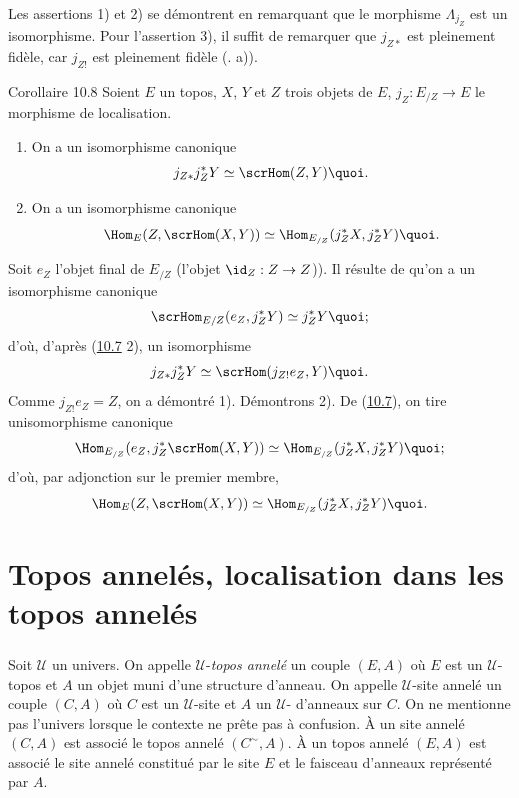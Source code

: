 \documentclass[10pt]{../fichiers-configuration-latex/smfart}
\begin{document}
Les assertions 1) et 2) se démontrent en remarquant que le morphisme
$\Lambda_{j_Z}$ est un isomorphisme. Pour l'assertion 3), il suffit
de remarquer que $j_{Z\ast}$ est pleinement fidèle, car $j_{Z!}$ est
pleinement fidèle (. a)).

\begin{enonce*}{Corollaire 10.8}
Soient $E$ un topos, $X$, $Y$ et $Z$ trois objets de $E$,
$j_Z:E_{/Z}\rightarrow E$ le morphisme de localisation.
\begin{enumerate}
\renewcommand{\labelenumi}{\theenumi)}
\item On a un isomorphisme canonique
$$
j_{Z\ast}j^{\ast}_ZY\simeq \scrHom(Z,Y){\quoi}.
$$

\item On a un isomorphisme canonique
$$
\Hom_E(Z,\scrHom(X,Y))\simeq \Hom_{E_{/Z}}(j^{\ast}_ZX,
j^{\ast}_ZY){\quoi}.
$$
\end{enumerate}
\end{enonce*}

Soit $e_Z$ l'objet final de $E_{/Z}$ (\ie l'objet
$\id_Z:Z\rightarrow Z$)). Il résulte de  qu'on a un
isomorphisme canonique
$$
\scrHom_{E/Z}(e_Z, j^{\ast}_ZY)\simeq j^{\ast}_ZY{\quoi};
$$
d'où, d'après (\hyperref[IV.cor10.7]{10.7} 2), un isomorphisme
$$
j_{Z\ast}j^{\ast}_Z Y\simeq \scrHom(j_{Z!}e_Z, Y){\quoi.}
$$
Comme $j_{Z!}e_Z=Z$, on a démontré 1). Démontrons 2). De
(\hyperref[IV.cor10.7]{10.7}), on tire un\pageoriginale isomorphisme canonique
$$
\Hom_{E_{/Z}}(e_Z, j^{\ast}_Z\scrHom(X,Y))\simeq
\Hom_{E_{/Z}}(j^{\ast}_Z X, j^{\ast}_ZY){\quoi};
$$
d'où, par adjonction sur le premier membre,
$$
\Hom_E(Z,\scrHom(X,Y))\simeq \Hom_{E_{/Z}}(j^{\ast}_ZX,
j^{\ast}_ZY){\quoi}.
$$

\section{Topos annelés, localisation dans les topos annelés}

\setcounter{subsection}{1} \setcounter{subsubsection}{0}
\subsubsection{}
Soit $𝒰$ un univers. On appelle $𝒰$-\emph{topos
annelé} un couple $(E,A)$ où $E$ est un $𝒰$-topos et $A$ un
objet muni d'une structure d'anneau. On appelle $𝒰$-site
annelé un couple $(C,A)$ où $C$ est un $𝒰$-site et $A$ un
$𝒰$- d'anneaux sur $C$. On ne mentionne pas
l'univers lorsque le contexte ne prête pas à confusion. À un site
annelé $(C,A)$ est associé le topos annelé $(C^{\sim},A)$. À un
topos annelé $(E,A)$ est associé le site annelé
constitué par le
site $E$ et le faisceau d'anneaux représenté par $A$.
\end{document}
